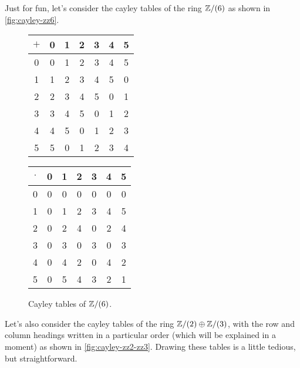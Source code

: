 Just for fun, let's consider the cayley tables of the ring \(\mathbb{Z}/(6)\) as shown in \autoref{fig:cayley-zz6}.
\begin{figure}[h!]
\begin{center}
\begin{tabular}{c|cccccc}
\(+\)
  & 0 & 1 & 2 & 3 & 4 & 5 \\ \hline
0 & 0 & 1 & 2 & 3 & 4 & 5 \\
1 & 1 & 2 & 3 & 4 & 5 & 0 \\
2 & 2 & 3 & 4 & 5 & 0 & 1 \\
3 & 3 & 4 & 5 & 0 & 1 & 2 \\
4 & 4 & 5 & 0 & 1 & 2 & 3 \\
5 & 5 & 0 & 1 & 2 & 3 & 4
\end{tabular}
\quad\quad
\begin{tabular}{c|cccccc}
\(\cdot\)
  & 0 & 1 & 2 & 3 & 4 & 5\\ \hline
0 & 0 & 0 & 0 & 0 & 0 & 0 \\
1 & 0 & 1 & 2 & 3 & 4 & 5 \\
2 & 0 & 2 & 4 & 0 & 2 & 4 \\
3 & 0 & 3 & 0 & 3 & 0 & 3 \\
4 & 0 & 4 & 2 & 0 & 4 & 2 \\
5 & 0 & 5 & 4 & 3 & 2 & 1 \\
\end{tabular}
\caption{\label{fig:cayley-zz6} Cayley tables of \(\mathbb{Z}/(6)\).}
\end{center}
\end{figure}
Let's also consider the cayley tables of the ring \(\mathbb{Z}/(2) \oplus \mathbb{Z}/(3)\), with the row and column headings written in a particular order (which will be explained in a moment) as shown in \autoref{fig:cayley-zz2-zz3}.
Drawing these tables is a little tedious, but straightforward.
